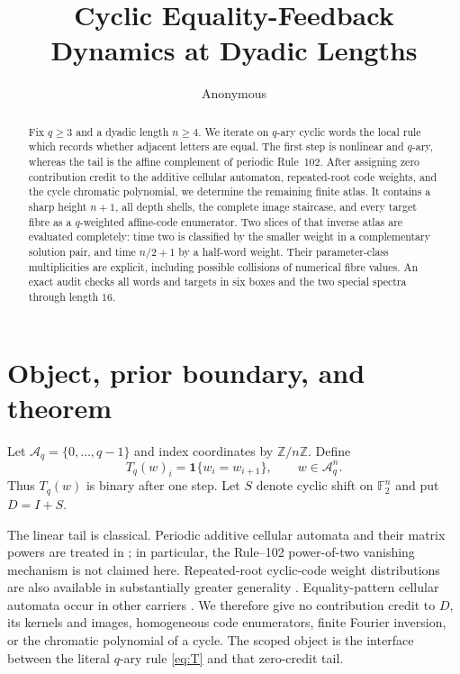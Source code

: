 \documentclass[a4paper,10pt]{amsart}
\title[Equality feedback at dyadic lengths]{Cyclic Equality-Feedback Dynamics at Dyadic Lengths}
\author{Anonymous}
\date{}
\theoremstyle{remark}
\newcommand{\F}{\mathbb F}
\begin{document}
\begin{abstract}
Fix $q\geq3$ and a dyadic length $n\geq4$.  We iterate on $q$-ary cyclic
words the local rule which records whether adjacent letters are equal.  The
first step is nonlinear and $q$-ary, whereas the tail is the affine
complement of periodic Rule~102.  After assigning zero contribution credit
to the additive cellular automaton, repeated-root code weights, and the
cycle chromatic polynomial, we determine the remaining finite atlas.  It
contains a sharp height $n+1$, all depth shells, the complete image
staircase, and every target fibre as a $q$-weighted affine-code enumerator.
Two slices of that inverse atlas are evaluated completely: time two is
classified by the smaller weight in a complementary solution pair, and time
$n/2+1$ by a half-word weight.  Their parameter-class multiplicities are
explicit, including possible collisions of numerical fibre values.  An
exact audit checks all words and targets in six boxes and the two special
spectra through length $16$.
\end{abstract}

\maketitle

\section{Object, prior boundary, and theorem}

Let $\mathcal A_q=\{0,\ldots,q-1\}$ and index coordinates by
$\mathbb Z/n\mathbb Z$.  Define
\begin{equation}\label{eq:T}
 T_q(w)_i=\mathbf 1\{w_i=w_{i+1}\},\qquad w\in\mathcal A_q^n.
\end{equation}
Thus $T_q(w)$ is binary after one step.  Let $S$ denote cyclic shift on
$\F_2^n$ and put $D=I+S$.

The linear tail is classical.  Periodic additive cellular automata and their
matrix powers are treated in \cite{MartinOdlyzkoWolfram1984,Kim2011}; in
particular, the Rule--102 power-of-two vanishing mechanism is not claimed
here.  Repeated-root cyclic-code weight distributions are also available in
substantially greater generality \cite{ZhaoEtAl2025}.  Equality-pattern
cellular automata occur in other carriers \cite{BolognesiCiancia2017}.  We
therefore give no contribution credit to $D$, its kernels and images,
homogeneous code enumerators, finite Fourier inversion, or the chromatic
polynomial of a cycle.  The scoped object is the interface between the
literal $q$-ary rule \eqref{eq:T} and that zero-credit tail.
\end{document}
